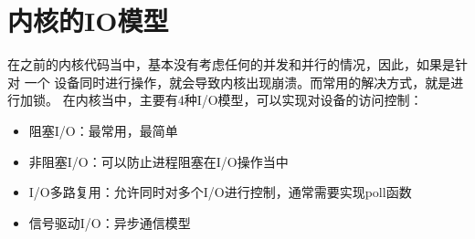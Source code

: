 \section{内核的IO模型}

在之前的内核代码当中，基本没有考虑任何的并发和并行的情况，因此，如果是针对
一个 设备同时进行操作，就会导致内核出现崩溃。而常用的解决方式，就是进行加锁。
在内核当中，主要有4种I/O模型，可以实现对设备的访问控制：
\begin{itemize}
  \item 阻塞I/O：最常用，最简单
  \item 非阻塞I/O：可以防止进程阻塞在I/O操作当中
  \item I/O多路复用：允许同时对多个I/O进行控制，通常需要实现poll函数
  \item 信号驱动I/O：异步通信模型
\end{itemize}

